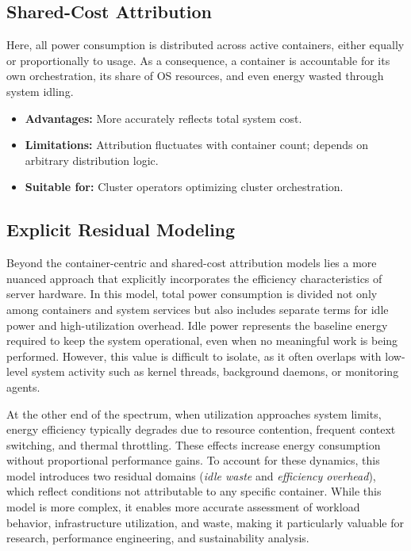\subsection{Shared-Cost Attribution}
\label{sec:shared-cost}

Here, all power consumption is distributed across active containers, either equally or proportionally to usage. As a consequence, a container is accountable for its own orchestration, its share of OS resources, and even energy wasted through system idling.

\begin{itemize}
    \item \textbf{Advantages:} More accurately reflects total system cost.
    \item \textbf{Limitations:} Attribution fluctuates with container count; depends on arbitrary distribution logic.
    \item \textbf{Suitable for:} Cluster operators optimizing cluster orchestration.
\end{itemize}

\subsection{Explicit Residual Modeling}
\label{sec:residual-model}

Beyond the container-centric and shared-cost attribution models lies a more nuanced approach that explicitly incorporates the efficiency characteristics of server hardware. In this model, total power consumption is divided not only among containers and system services but also includes separate terms for idle power and high-utilization overhead. Idle power represents the baseline energy required to keep the system operational, even when no meaningful work is being performed. However, this value is difficult to isolate, as it often overlaps with low-level system activity such as kernel threads, background daemons, or monitoring agents.

At the other end of the spectrum, when utilization approaches system limits, energy efficiency typically degrades due to resource contention, frequent context switching, and thermal throttling\parencite{harchol2013performance}. These effects increase energy consumption without proportional performance gains. To account for these dynamics, this model introduces two residual domains (\textit{idle waste} and \textit{efficiency overhead}), which reflect conditions not attributable to any specific container. While this model is more complex, it enables more accurate assessment of workload behavior, infrastructure utilization, and waste, making it particularly valuable for research, performance engineering, and sustainability analysis.

